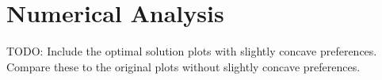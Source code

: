 \documentclass[AER]{AEA}
\begin{document}
\section{Numerical Analysis}

TODO: Include the optimal solution plots with slightly concave preferences. Compare these to the original plots without slightly concave preferences.




            
        
    




\end{document}
